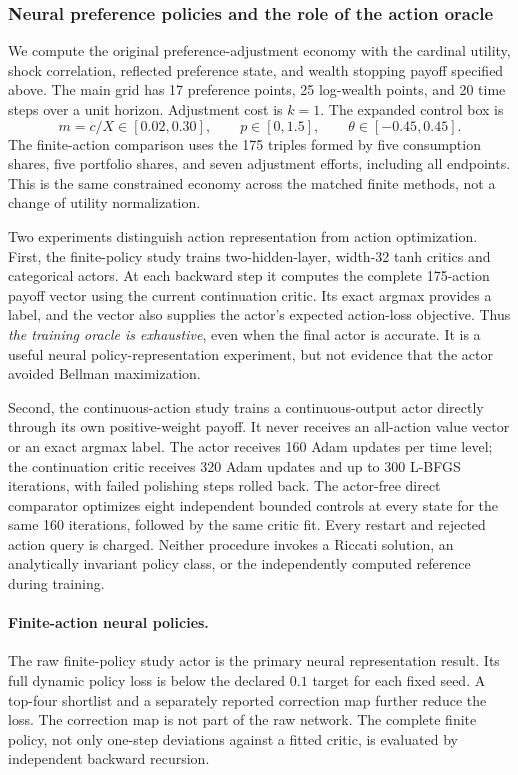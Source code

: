 \subsubsection{Neural preference policies and the role of the action oracle}\label{sec:ndu-neural}
We compute the original preference-adjustment economy with the cardinal utility, shock correlation, reflected preference state, and wealth stopping payoff specified above. The main grid has 17 preference points, 25 log-wealth points, and 20 time steps over a unit horizon. Adjustment cost is $k=1$. The expanded control box is
\[
 m=c/X\in[0.02,0.30],\qquad p\in[0,1.5],\qquad\theta\in[-0.45,0.45].
\]
The finite-action comparison uses the 175 triples formed by five consumption shares, five portfolio shares, and seven adjustment efforts, including all endpoints. This is the same constrained economy across the matched finite methods, not a change of utility normalization.

Two experiments distinguish action representation from action optimization. First, the finite-policy study trains two-hidden-layer, width-32 tanh critics and categorical actors. At each backward step it computes the complete 175-action payoff vector using the current continuation critic. Its exact argmax provides a label, and the vector also supplies the actor's expected action-loss objective. Thus \emph{the training oracle is exhaustive}, even when the final actor is accurate. It is a useful neural policy-representation experiment, but not evidence that the actor avoided Bellman maximization.

Second, the continuous-action study trains a continuous-output actor directly through its own positive-weight payoff. It never receives an all-action value vector or an exact argmax label. The actor receives 160 Adam updates per time level; the continuation critic receives 320 Adam updates and up to 300 L-BFGS iterations, with failed polishing steps rolled back. The actor-free direct comparator optimizes eight independent bounded controls at every state for the same 160 iterations, followed by the same critic fit. Every restart and rejected action query is charged. Neither procedure invokes a Riccati solution, an analytically invariant policy class, or the independently computed reference during training.

\paragraph*{Finite-action neural policies.}
The raw finite-policy study actor is the primary neural representation result. Its full dynamic policy loss is below the declared $0.1$ target for each fixed seed. A top-four shortlist and a separately reported correction map further reduce the loss. The correction map is not part of the raw network. The complete finite policy, not only one-step deviations against a fitted critic, is evaluated by independent backward recursion.

